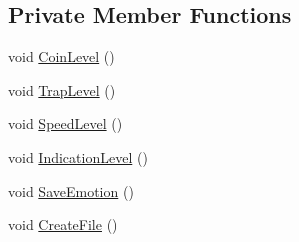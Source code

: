 \subsection*{Private Member Functions}
\begin{DoxyCompactItemize}
\item 
void \mbox{\hyperlink{class_platforms_generation_pre_exp_controller_aa213ed76246b6ad719c7eabc6a25aba5}{Coin\+Level}} ()
\item 
void \mbox{\hyperlink{class_platforms_generation_pre_exp_controller_a8ae21aaf7745d820b1d60e4625d36e3d}{Trap\+Level}} ()
\item 
void \mbox{\hyperlink{class_platforms_generation_pre_exp_controller_a0ba21c290c24ae5483d63478d9f3de06}{Speed\+Level}} ()
\item 
void \mbox{\hyperlink{class_platforms_generation_pre_exp_controller_acb5e22efde6628c2f8a6fef1cde44188}{Indication\+Level}} ()
\item 
void \mbox{\hyperlink{class_platforms_generation_pre_exp_controller_acd757f0ea832635ed6757c5dda9c6d7c}{Save\+Emotion}} ()
\item 
void \mbox{\hyperlink{class_platforms_generation_pre_exp_controller_a9d3c60022d8fde289a74656263ad1ad3}{Create\+File}} ()
\end{DoxyCompactItemize}
